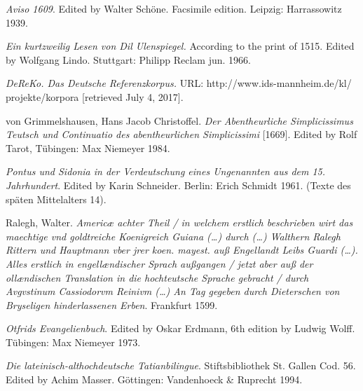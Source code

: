 \documentclass[output=paper
                ,modfonts
                ,nonflat
	        ,collection
	        ,collectionchapter
	        ,collectiontoclongg
 	        ,biblatex
                ,babelshorthands
                ,newtxmath
                ,draftmode
                ,colorlinks, citecolor=brown
]{./langsci/langscibook}
\begin{document}
\begin{description}
\setlength{\itemsep}{0pt}
\item \textit{Aviso 1609}. Edited by Walter Schöne. Facsimile edition. Leipzig: Harrassowitz 1939.
\item \textit{Ein kurtzweilig Lesen von Dil Ulenspiegel.} According to the print of 1515. Edited by Wolfgang Lindo. Stuttgart: Philipp Reclam jun. 1966.
\item \textit{DeReKo. Das Deutsche Referenzkorpus.} URL: http://www.ids-mannheim.de/kl/\\projekte/korpora [retrieved July 4, 2017].
\item von Grimmelshausen, Hans Jacob Christoffel. \textit{Der Abentheurliche Simplicissimus Teutsch und Continuatio des abentheurlichen Simplicissimi} [1669]. Edited by Rolf Tarot, Tübingen: Max Niemeyer 1984.
\item \textit{Pontus und Sidonia in der Verdeutschung eines Ungenannten aus dem 15. Jahrhundert}. Edited by Karin Schneider. Berlin: Erich Schmidt 1961. (Texte des späten Mittelalters 14).
\item Ralegh, Walter. \textit{Americæ achter Theil / in welchem erstlich beschrieben wirt das maechtige vnd goldtreiche Koenigreich Guiana (\dots) durch (\dots) Walthern Ralegh Rittern und Hauptmann vber jrer koen. mayest. auß Engellandt Leibs Guardi (\dots). Alles erstlich in engellændischer Sprach außgangen / jetzt aber auß der ollændischen Translation in die hochteutsche Sprache gebracht / durch Avgvstinum Cassiodorvm Reinivm (\dots) An Tag gegeben durch Dieterschen von Bryseligen hinderlassenen Erben}. Frankfurt 1599.
\item \textit{Otfrids Evangelienbuch}. Edited by Oskar Erdmann, 6th edition by Ludwig Wolff. Tübingen: Max Niemeyer 1973.
\item \textit{Die lateinisch-althochdeutsche Tatianbilingue}. Stiftsbibliothek St. Gallen Cod. 56. Edited by Achim Masser. Göttingen: Vandenhoeck \& Ruprecht 1994.
\end{description}

{\sloppy
\printbibliography[heading=subbibliography,notkeyword=this]
}
\end{document}
